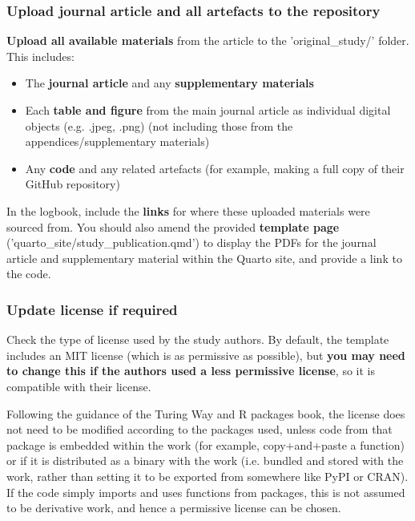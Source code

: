 \vspace{0.5cm}
\subsubsection{Upload journal article and all artefacts to the repository}

 \textbf{Upload all available materials} from the article to the 'original\_study/' folder. This includes:
\begin{itemize}
    \item The \textbf{journal article} and any \textbf{supplementary materials}
    \item Each \textbf{table and figure} from the main journal article as individual digital objects (e.g. .jpeg, .png) (not including those from the appendices/supplementary materials)
    \item Any \textbf{code} and any related artefacts (for example, making a full copy of their GitHub repository)
\end{itemize}

In the logbook, include the \textbf{links} for where these uploaded materials were sourced from. You should also amend the provided \textbf{template page} ('quarto\_site/study\_publication.qmd') to display the PDFs for the journal article and supplementary material within the Quarto site, and provide a link to the code.

\subsubsection{Update license if required}

Check the type of license used by the study authors. By default, the template includes an MIT license (which is as permissive as possible), but \textbf{you may need to change this if the authors used a less permissive license}, so it is compatible with their license.

Following the guidance of the Turing Way\autocite{the_turing_way_community_turing_2022} and R packages book,\autocite{wickham_12_2023} the license does not need to be modified according to the packages used, unless code from that package is embedded within the work (for example, copy+and+paste a function) or if it is distributed as a binary with the work (i.e. bundled and stored with the work, rather than setting it to be exported from somewhere like PyPI or CRAN). If the code simply imports and uses functions from packages, this is not assumed to be derivative work, and hence a permissive license can be chosen.

